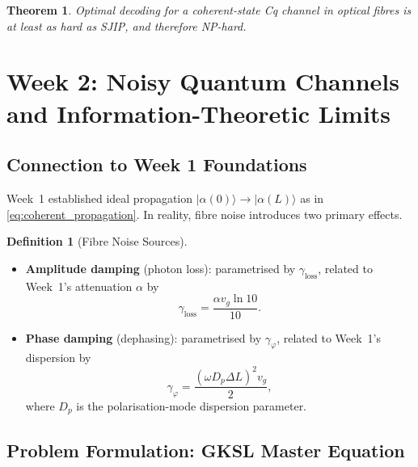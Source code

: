 \documentclass[12pt,a4paper]{article}
\theoremstyle{definition}
\newtheorem{definition}{Definition}[section]
\theoremstyle{plain}
\newtheorem{theorem}{Theorem}[section]
\begin{document}
\begin{theorem}
Optimal decoding for a coherent-state Cq channel in optical fibres is at least as hard
as SJIP, and therefore NP-hard.
\end{theorem}

\section{Week 2: Noisy Quantum Channels and Information-Theoretic Limits}

\subsection{Connection to Week 1 Foundations}

Week~1 established ideal propagation $|\alpha(0)\rangle\to|\alpha(L)\rangle$ as in
\cref{eq:coherent_propagation}. In reality, fibre noise introduces two primary effects.

\begin{definition}[Fibre Noise Sources]
\begin{itemize}
  \item \textbf{Amplitude damping} (photon loss): parametrised by $\gamma_{\mathrm{loss}}$, related to Week~1's attenuation $\alpha$ by
    \begin{equation}
      \gamma_{\mathrm{loss}}=\frac{\alpha v_g\ln10}{10}.
      \label{eq:gamma_loss}
    \end{equation}
  \item \textbf{Phase damping} (dephasing): parametrised by $\gamma_\varphi$, related to Week~1's dispersion by
    \begin{equation}
      \gamma_\varphi=\frac{(\omega D_p\Delta L)^2 v_g}{2},
      \label{eq:gamma_phi}
    \end{equation}
    where $D_p$ is the polarisation-mode dispersion parameter.
\end{itemize}
\end{definition}

\subsection{Problem Formulation: GKSL Master Equation}
\label{sec:week2_problem}
\end{document}
